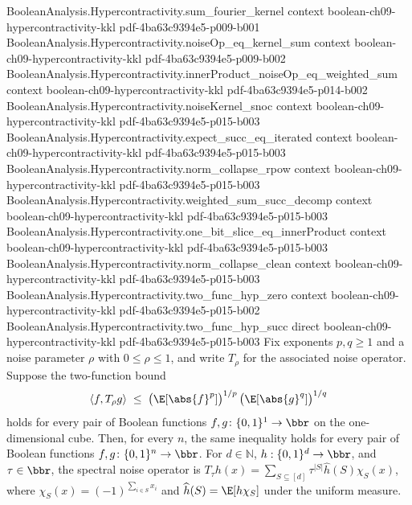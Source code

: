 \begin{theorem}
\proofstep
  {BooleanAnalysis.Hypercontractivity.sum_fourier_kernel}
  {context}
  {boolean-ch09-hypercontractivity-kkl}
  {pdf-4ba63c9394e5-p009-b001}
\proofstep
  {BooleanAnalysis.Hypercontractivity.noiseOp_eq_kernel_sum}
  {context}
  {boolean-ch09-hypercontractivity-kkl}
  {pdf-4ba63c9394e5-p009-b002}
\proofstep
  {BooleanAnalysis.Hypercontractivity.innerProduct_noiseOp_eq_weighted_sum}
  {context}
  {boolean-ch09-hypercontractivity-kkl}
  {pdf-4ba63c9394e5-p014-b002}
\proofstep
  {BooleanAnalysis.Hypercontractivity.noiseKernel_snoc}
  {context}
  {boolean-ch09-hypercontractivity-kkl}
  {pdf-4ba63c9394e5-p015-b003}
\proofstep
  {BooleanAnalysis.Hypercontractivity.expect_succ_eq_iterated}
  {context}
  {boolean-ch09-hypercontractivity-kkl}
  {pdf-4ba63c9394e5-p015-b003}
\proofstep
  {BooleanAnalysis.Hypercontractivity.norm_collapse_rpow}
  {context}
  {boolean-ch09-hypercontractivity-kkl}
  {pdf-4ba63c9394e5-p015-b003}
\proofstep
  {BooleanAnalysis.Hypercontractivity.weighted_sum_succ_decomp}
  {context}
  {boolean-ch09-hypercontractivity-kkl}
  {pdf-4ba63c9394e5-p015-b003}
\proofstep
  {BooleanAnalysis.Hypercontractivity.one_bit_slice_eq_innerProduct}
  {context}
  {boolean-ch09-hypercontractivity-kkl}
  {pdf-4ba63c9394e5-p015-b003}
\proofstep
  {BooleanAnalysis.Hypercontractivity.norm_collapse_clean}
  {context}
  {boolean-ch09-hypercontractivity-kkl}
  {pdf-4ba63c9394e5-p015-b003}
\proofstep
  {BooleanAnalysis.Hypercontractivity.two_func_hyp_zero}
  {context}
  {boolean-ch09-hypercontractivity-kkl}
  {pdf-4ba63c9394e5-p015-b002}
\proofstep
  {BooleanAnalysis.Hypercontractivity.two_func_hyp_succ}
  {direct}
  {boolean-ch09-hypercontractivity-kkl}
  {pdf-4ba63c9394e5-p015-b003}
Fix exponents $p, q \ge 1$ and a noise parameter $\rho$ with $0 \le \rho \le 1$, and
write $T_\rho$ for the associated noise operator. Suppose the two-function bound
\[
\langle f, T_\rho g\rangle \;\le\;
\bigl(\E[\abs{f}^p]\bigr)^{1/p}\,\bigl(\E[\abs{g}^q]\bigr)^{1/q}
\]
holds for every pair of Boolean functions $f, g \colon \{0,1\}^1 \to \bbr$ on the
one-dimensional cube. Then, for every $n$, the same inequality holds for every pair of
Boolean functions $f, g \colon \{0,1\}^n \to \bbr$. For $d\in\mathbb N$,
$h:\{0,1\}^d\to\bbr$, and $\tau\in\bbr$, the spectral noise operator is $T_\tau
h(x)=\sum_{S\subseteq[d]}\tau^{|S|}\widehat h(S)\chi_S(x)$, where
$\chi_S(x)=(-1)^{\sum_{i\in S}x_i}$ and $\widehat h(S)=\E[h\chi_S]$ under the uniform
measure.
\end{theorem}

